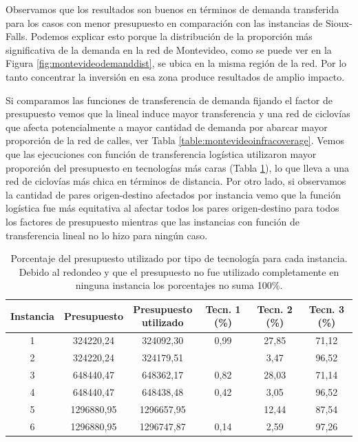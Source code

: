 Observamos que los resultados son buenos en términos de demanda transferida para los casos con menor presupuesto en comparación con las instancias de Sioux-Falls. Podemos explicar esto porque la distribución de la proporción más significativa de la demanda en la red de Montevideo, como se puede ver en la Figura \ref{fig:montevideodemanddist}, se ubica en la misma región de la red. Por lo tanto concentrar la inversión en esa zona produce resultados de amplio impacto.

Si comparamos las funciones de transferencia de demanda fijando el factor de presupuesto vemos que la lineal induce mayor transferencia y una red de ciclovías que afecta potencialmente a mayor cantidad de demanda por abarcar mayor proporción de la red de calles, ver Tabla \ref{table:montevideoinfracoverage}. Vemos que las ejecuciones con función de transferencia logística utilizaron mayor proporción del presupuesto en tecnologías más caras (Tabla \ref{table:montevideobudgetusage}), lo que lleva a una red de ciclovías más chica en términos de distancia. Por otro lado, si observamos la cantidad de pares origen-destino afectados por instancia vemo que la función logística fue más equitativa al afectar todos los pares origen-destino para todos los factores de presupuesto mientras que las instancias con función de transferencia lineal no lo hizo para ningún caso.

\begin{table}[h!]
  \centering
  \begin{adjustbox}{width=1.2\textwidth,center=\textwidth}
    \begin{tabular}{cccccc}
      \toprule
        Instancia & Presupuesto & \shortstack{Presupuesto \\ utilizado} & Tecn. 1 (\%) & Tecn. 2 (\%) & Tecn. 3 (\%) \\
      \midrule
        1 & 324220,24 & 324092,30 & 0,99 & 27,85 & 71,12 \\
        2 & 324220,24 & 324179,51 &  & 3,47 & 96,52 \\
        3 & 648440,47 & 648362,17 & 0,82 & 28,03 & 71,14 \\
        4 & 648440,47 & 648438,48 & 0,42 & 3,05 & 96,52 \\
        5 & 1296880,95 & 1296657,95 &  & 12,44 & 87,54 \\
        6 & 1296880,95 & 1296747,87 & 0,14 & 2,59 & 97,26 \\
      \bottomrule
    \end{tabular}
  \end{adjustbox}
  \caption{Porcentaje del presupuesto utilizado por tipo de tecnología para cada instancia. Debido al redondeo y que el presupuesto no fue utilizado completamente en ninguna instancia los porcentajes no suma 100\%.}\label{table:montevideobudgetusage}
\end{table}

